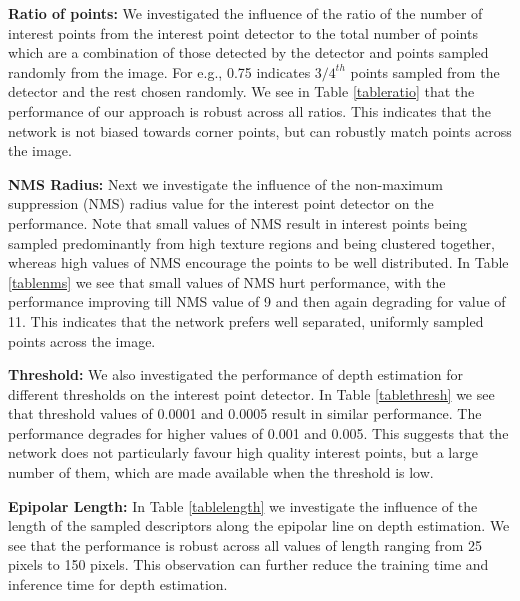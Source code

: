\documentclass[runningheads]{llncs}
\begin{document}
\vspace{4mm}
\noindent
\textbf{Ratio of points:} We investigated the influence of the ratio of the number of interest points from the interest point detector to the total number of points which are a combination of those detected by the detector and points sampled randomly from the image. For e.g., 0.75 indicates $3/4^{th}$ points sampled from the detector and the rest chosen randomly. We see in Table \ref{tableratio} that the performance of our approach is robust across all ratios. This indicates that the network is not biased towards corner points, but can robustly match points across the image. 

\vspace{4mm}
\noindent
\textbf{NMS Radius:} Next we investigate the influence of the non-maximum suppression (NMS) radius value for the interest point detector on the performance. Note that small values of NMS result in interest points being sampled predominantly from high texture regions and being clustered together, whereas high values of NMS encourage the points to be well distributed. In Table \ref{tablenms} we see that small values of NMS hurt performance, with the performance improving till NMS value of 9 and then again degrading for value of 11. This indicates that the network prefers well separated, uniformly sampled points across the image.   

\vspace{4mm}
\noindent
\textbf{Threshold:} We also investigated the performance of depth estimation for different thresholds on the interest point detector. In Table \ref{tablethresh} we see that threshold values of 0.0001 and 0.0005 result in similar performance. The performance degrades for higher values of 0.001 and 0.005. This suggests that the network does not particularly favour high quality interest points, but a large number of them, which are made available when the threshold is low. 

\vspace{4mm}
\noindent
\textbf{Epipolar Length:} In Table \ref{tablelength} we investigate the influence of the length of the sampled descriptors along the epipolar line on depth estimation. We see that the performance is robust across all values of length ranging from 25 pixels to 150 pixels. This observation can further reduce the training time and inference time for depth estimation. 
\end{document}
